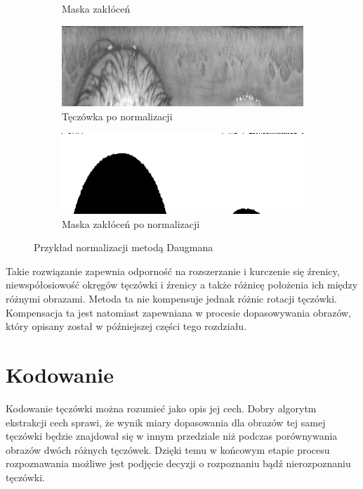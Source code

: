 \begin{figure}[ht]
\begin{subfigure}[b]{0.35\textwidth}
    \caption{Maska zakłóceń}
  \end{subfigure}
  \begin{subfigure}[b]{0.35\textwidth}
    \includegraphics[width=\textwidth]{images/normalization/irisNormalized.png}
    \caption{Tęczówka po normalizacji}
  \end{subfigure}
  \begin{subfigure}[b]{0.35\textwidth}
    \includegraphics[width=\textwidth]{images/normalization/maskNormalized.png}
    \caption{Maska zakłóceń po normalizacji}
  \end{subfigure}
  \caption{Przykład normalizacji metodą Daugmana}
  \label{fig:normalizationExample}
\end{figure}

Takie rozwiązanie zapewnia odpornoś\'c na rozszerzanie i kurczenie się \'zrenicy, niewspółosiowoś\'c
okręgów tęczówki i \'zrenicy a także różnicę położenia ich między różnymi obrazami. Metoda ta nie
kompensuje jednak różnic rotacji tęczówki. Kompensacja ta jest natomiast zapewniana w procesie
dopasowywania obrazów, który opisany został w pó\'zniejszej części tego rozdziału.

\section{Kodowanie}

Kodowanie tęczówki można rozumie\'c jako opis jej cech.
Dobry algorytm ekstrakcji cech sprawi, że wynik miary dopasowania dla obrazów tej samej tęczówki
będzie znajdował się w innym przedziale niż podczas porównywania obrazów dwóch
różnych tęczówek. Dzięki temu w końcowym etapie procesu rozpoznawania możliwe jest podjęcie decyzji
o rozpoznaniu bąd\'z nierozpoznaniu tęczówki.

